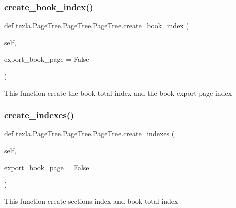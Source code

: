 \subsubsection{\texorpdfstring{create\+\_\+book\+\_\+index()}{create\_book\_index()}}
{\footnotesize\ttfamily def texla.\+Page\+Tree.\+Page\+Tree.\+Page\+Tree.\+create\+\_\+book\+\_\+index (\begin{DoxyParamCaption}\item[{}]{self,  }\item[{}]{export\+\_\+book\+\_\+page = {\ttfamily False} }\end{DoxyParamCaption})}

\begin{DoxyVerb}This function create the book total index
and the book export page index\end{DoxyVerb}
 \hypertarget{classtexla_1_1PageTree_1_1PageTree_1_1PageTree_a10ee2f8c6ce2484cf8a32e4ca8edce56}{}\label{classtexla_1_1PageTree_1_1PageTree_1_1PageTree_a10ee2f8c6ce2484cf8a32e4ca8edce56} 
\subsubsection{\texorpdfstring{create\+\_\+indexes()}{create\_indexes()}}
{\footnotesize\ttfamily def texla.\+Page\+Tree.\+Page\+Tree.\+Page\+Tree.\+create\+\_\+indexes (\begin{DoxyParamCaption}\item[{}]{self,  }\item[{}]{export\+\_\+book\+\_\+page = {\ttfamily False} }\end{DoxyParamCaption})}

\begin{DoxyVerb}This function create sections index and
book total index\end{DoxyVerb}
 \hypertarget{classtexla_1_1PageTree_1_1PageTree_1_1PageTree_ac21290653e2f62b62d23d61ad0f856bd}{}\label{classtexla_1_1PageTree_1_1PageTree_1_1PageTree_ac21290653e2f62b62d23d61ad0f856bd} 
